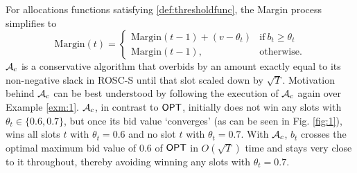 For allocations functions satisfying \eqref{def:thresholdfunc}, the Margin process  simplifies to 
   \begin{equation}\label{defn:marginprocess}
\text{Margin}(t) = \begin{cases} \text{Margin}(t-1) + (v-\theta_t) & \text{if} \ b_t \ge \theta_t 
\\ 
 \text{Margin}(t-1), & \text{otherwise}.
 \end{cases}
\end{equation}
$\mathcal{A}_c$ is a conservative algorithm that overbids by an amount exactly equal to its non-negative slack in ROSC-S until that slot scaled down by $\sqrt{T}$. 
Motivation behind $\mathcal{A}_c$ can be best understood by following the execution of $\mathcal{A}_c$ again over Example \ref{exm:1}.
$\mathcal{A}_c$, in contrast to $\mathsf{OPT}$, initially does not win any slots with $\theta_t \in \{0.6, 0.7\}$, but once its bid value `converges' (as can be seen in Fig. \ref{fig:1}), wins all slots $t$ with $\theta_t =0.6$ and no slot $t$ with $\theta_t=0.7$. With $\mathcal{A}_c$, $b_t$ crosses the optimal maximum bid value of $0.6$ of $\mathsf{OPT}$ in $O(\sqrt{T})$ time and stays very close to it throughout, thereby avoiding winning any slots with $\theta_t=0.7$. 


